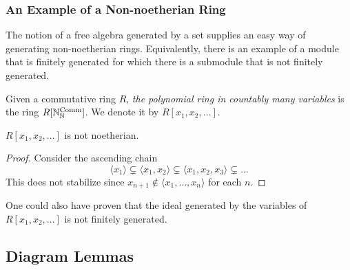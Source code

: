 \subsubsection{An Example of a Non-noetherian Ring}
    The notion of a free algebra generated by a set supplies an easy way of generating non-noetherian rings. Equivalently, there is an example of a module that is finitely generated for which there is a submodule that is not finitely generated. 
    \begin{definition}
        Given a commutative ring $R$, \emph{the polynomial ring in countably many variables} is the ring $R[\mathbb{N}_{\mathbb{N}}^{\mathrm{Comm}}]$. We denote it by $R[x_1,x_2,\dots]$. 
    \end{definition}
    \begin{proposition}
        $R[x_1,x_2,\dots]$ is not noetherian.
    \end{proposition}
    \begin{proof}
        Consider the ascending chain 
        $$
            \langle x_1\rangle \subsetneq \langle x_1,x_2 \rangle \subsetneq \langle x_1,x_2,x_3 \rangle \subsetneq \dots
        $$
        This does not stabilize since $x_{n+1}\notin \langle x_1,\dots,x_n\rangle$ for each $n$. 
   \end{proof}
   \begin{remark}
        One could also have proven that the ideal generated by the variables of $R[x_1,x_2,\dots]$ is not finitely generated.
   \end{remark} 
\subsection{Diagram Lemmas}
